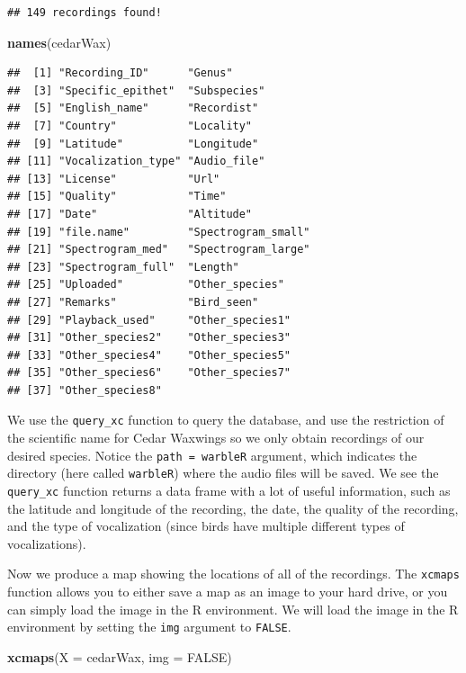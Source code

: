 \documentclass[
]{krantz}
\newenvironment{Shaded}{\begin{snugshade}}{\end{snugshade}}
\newcommand{\DataTypeTok}[1]{\textcolor[rgb]{0.13,0.29,0.53}{#1}}
\newcommand{\KeywordTok}[1]{\textcolor[rgb]{0.13,0.29,0.53}{\textbf{#1}}}
\newcommand{\NormalTok}[1]{#1}
\newcommand{\OtherTok}[1]{\textcolor[rgb]{0.56,0.35,0.01}{#1}}
\begin{document}
\begin{verbatim}
## 149 recordings found!
\end{verbatim}

\begin{Shaded}
\begin{Highlighting}[]
\KeywordTok{names}\NormalTok{(cedarWax)}
\end{Highlighting}
\end{Shaded}

\begin{verbatim}
##  [1] "Recording_ID"      "Genus"            
##  [3] "Specific_epithet"  "Subspecies"       
##  [5] "English_name"      "Recordist"        
##  [7] "Country"           "Locality"         
##  [9] "Latitude"          "Longitude"        
## [11] "Vocalization_type" "Audio_file"       
## [13] "License"           "Url"              
## [15] "Quality"           "Time"             
## [17] "Date"              "Altitude"         
## [19] "file.name"         "Spectrogram_small"
## [21] "Spectrogram_med"   "Spectrogram_large"
## [23] "Spectrogram_full"  "Length"           
## [25] "Uploaded"          "Other_species"    
## [27] "Remarks"           "Bird_seen"        
## [29] "Playback_used"     "Other_species1"   
## [31] "Other_species2"    "Other_species3"   
## [33] "Other_species4"    "Other_species5"   
## [35] "Other_species6"    "Other_species7"   
## [37] "Other_species8"
\end{verbatim}

We use the \texttt{query\_xc} function to query the database, and use the restriction of the scientific name for Cedar Waxwings so we only obtain recordings of our desired species. Notice the \texttt{path\ =\ \textquotesingle{}warbleR\textquotesingle{}} argument, which indicates the directory (here called \texttt{warbleR}) where the audio files will be saved. We see the \texttt{query\_xc} function returns a data frame with a lot of useful information, such as the latitude and longitude of the recording, the date, the quality of the recording, and the type of vocalization (since birds have multiple different types of vocalizations).

Now we produce a map showing the locations of all of the recordings. The \texttt{xcmaps} function allows you to either save a map as an image to your hard drive, or you can simply load the image in the R environment. We will load the image in the R environment by setting the \texttt{img} argument to \texttt{FALSE}.

\begin{Shaded}
\begin{Highlighting}[]
\KeywordTok{xcmaps}\NormalTok{(}\DataTypeTok{X =}\NormalTok{ cedarWax, }\DataTypeTok{img =} \OtherTok{FALSE}\NormalTok{)}
\end{Highlighting}
\end{Shaded}
\end{document}
